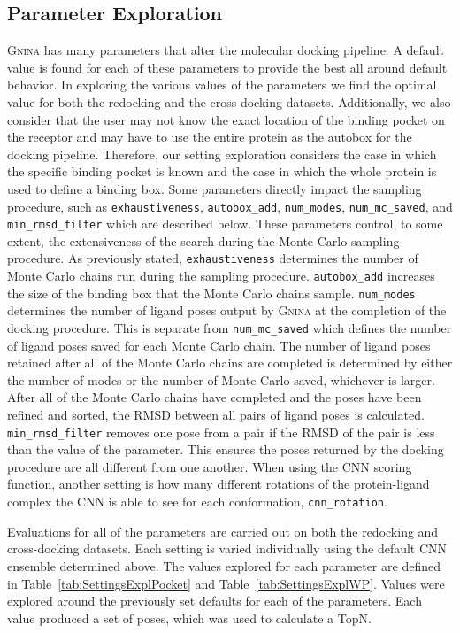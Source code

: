 \documentclass[journal=jcisd8,manuscript=article]{achemso}
\begin{document}
\subsection{Parameter Exploration}
\textsc{Gnina} has many parameters that alter the molecular docking pipeline. A default value is found for each of these parameters to provide the best all around default behavior. In exploring the various values of the parameters we find the optimal value for both the redocking and the cross-docking datasets. Additionally, we also consider that the user may not know the exact location of the binding pocket on the receptor and may have to use the entire protein as the autobox for the docking pipeline. Therefore, our setting exploration considers the case in which the specific binding pocket is known and the case in which the whole protein is used to define a binding box. Some parameters directly impact the sampling procedure, such as \texttt{exhaustiveness}, \texttt{autobox\_add}, \texttt{num\_modes}, \texttt{num\_mc\_saved}, and \texttt{min\_rmsd\_filter} which are described below. These parameters control, to some extent, the extensiveness of the search during the Monte Carlo sampling procedure. As previously stated, \texttt{exhaustiveness} determines the number of Monte Carlo chains run during the sampling procedure. \texttt{autobox\_add} increases the size of the binding box that the Monte Carlo chains sample. \texttt{num\_modes} determines the number of ligand poses output by \textsc{Gnina} at the completion of the docking procedure. This is separate from \texttt{num\_mc\_saved} which defines the number of ligand poses saved for each Monte Carlo chain. The number of ligand poses retained after all of the Monte Carlo chains are completed is determined by either the number of modes or the number of Monte Carlo saved, whichever is larger. After all of the Monte Carlo chains have completed and the poses have been refined and sorted, the RMSD between all pairs of ligand poses is calculated. \texttt{min\_rmsd\_filter} removes one pose from a pair if the RMSD of the pair is less than the value of the parameter. This ensures the poses returned by the docking procedure are all different from one another. When using the CNN scoring function, another setting is how many different rotations of the protein-ligand complex the CNN is able to see for each conformation, \texttt{cnn\_rotation}.

Evaluations for all of the parameters are carried out on both the redocking and cross-docking datasets. Each setting is varied individually using the default CNN ensemble determined above. The values explored for each parameter are defined in Table~\ref{tab:SettingsExplPocket} and Table~\ref{tab:SettingsExplWP}. Values were explored around the previously set defaults for each of the parameters. Each value produced a set of poses, which was used to calculate a TopN.
\end{document}
